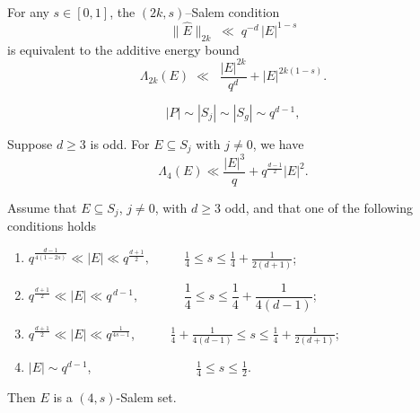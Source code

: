\documentclass[10pt,a4paper]{amsart}
\begin{document}
\begin{corollary}\label{cor:euivalence-Salem-bound}
	For any $s\in[0,1]$, the $(2k, s)$--Salem condition
	\begin{equation*}
		\|\widehat{E}\|_{2k}
		\;\ll\; q^{-d }\,|E|^{1-s}
	\end{equation*}
	is equivalent to the additive energy bound
	\begin{equation*}
		\Lambda_{2k}(E)
		\;\ll\;
		\; \frac{|E|^{2k}}{q^d}+ |E|^{2k(1-s)}.
	\end{equation*}
\end{corollary}

\begin{equation}\label{SizePS} |P|\sim |S_j|\sim |S_g|\sim q^{d-1},\end{equation} 

\begin{lemma}\label{lemma2.6}
Suppose $d\ge 3$ is odd. For $E \subseteq S_j$ with $j\ne 0$, we have
\[
\Lambda_4(E) \ll \frac{|E|^3}{q} + q^{\frac{d-1}{2}}|E|^2.
\]
\end{lemma}

\begin{proposition}\label{propro1}
Assume that $E \subseteq S_j$, $j\ne 0$, with $d \ge 3$ odd, and that one of the following conditions holds
\begin{enumerate} 
    \item[(i)] $q^{\frac{d-1}{4(1-2s)}} \ll |E| \ll q^{\frac{d+1}{2}}, \qquad~~~\frac{1}{4}\leq s \leq \frac{1}{4}+\frac{1}{2(d+1)}$; 
    \item[(ii)] $q^{\frac{d+1}{2}} \ll |E| \ll q^{\,d-1}, \qquad ~~~~~~~ \dfrac{1}{4} \le s \le \dfrac{1}{4} + \dfrac{1}{4(d-1)}$;
    \item[(iii)] $q^{\frac{d+1}{2}} \ll |E| \ll q^{\frac{1}{4s-1}}$,\qquad~~~~~ $\frac{1}{4}+\frac{1}{4(d-1)} \leq s \leq \frac{1}{4}+\frac{1}{2(d+1)}$; 
    \item[(iv)] $|E|\sim q^{d-1} $,\qquad~~~~~~~~~~~~~~~~ $ \frac{1}{4} \leq s\le\frac{1}{2}$. 
\end{enumerate}
Then $E$ is a $(4,s)$\textnormal{-Salem set.}
\end{proposition}
\end{document}

